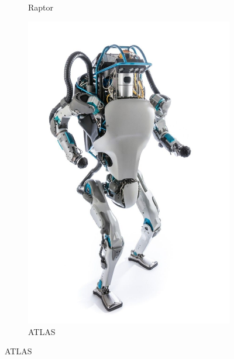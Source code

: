 \begin{figure}[h]
\begin{subfigure}[b]{0.32\textwidth}
        \caption{Raptor}
        \label{fig:kaist}
    \end{subfigure}
    \centering
    \begin{subfigure}[b]{0.32\textwidth}
        \includegraphics[width=\textwidth]{figures/biped_atlas.jpg}
        \caption{ATLAS}
        \label{fig:atlas}
    \end{subfigure}
\end{figure}







